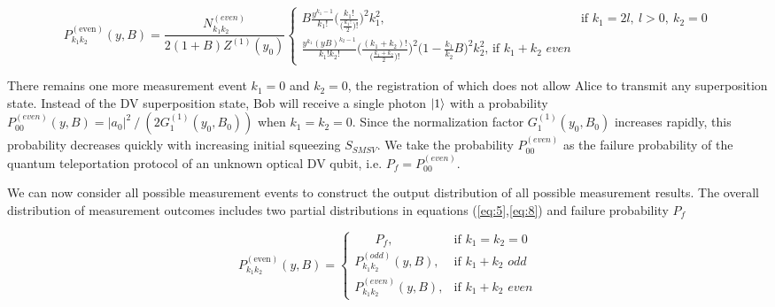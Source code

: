 \documentclass{optica-article}
\begin{document}
\begin{equation}\label{eq:8}
		P_{k_1 k_2}^{(\text{even})}(y,B) =  \frac{N_{k_1k_2}^{(even)}}{2(1+B)Z^{(1)}(y_0)} 
		\begin{cases}
			B\frac{y^{k_1-1}}{k_1!}\Bigg(\frac{k_1!}{\Big(\frac{k_1!}{2}\Big)!}\Bigg)^2k_1^2, & \!\!\!\!\!\!\!\!\!\!\!\!\!\!\!\!\!\!\!\!\!\!\!\!\!\!\!\!\!\!\!\!\!\!\!\!\!\!\!\!\!\!\!\!\!\!\!\!\!\!\!\!\!\!\!\!\!\!\!\!\!\!\!\!\!\!\!\!\!\!\!\!\!\!\!\!\!\!\!\!\!\!\!\!\!\!\!\!\!\!\!
            \text{if } k_1 = 2l,\ l>0,\ k_2 = 0 \\[3ex]
			\frac{y^{k_1}(yB)^{k_2-1}}{k_1!k_2!}\Bigg(\frac{(k_1+k_2)!}{\Big(\frac{k_1+k_2}{2}\Big)!}\Bigg)^2\Big(1-\frac{k_1}{k_2}B\Big)^2k_2^2 , \, \text{if}\,\,k_1+k_2 \,\,even
		\end{cases}
\end{equation}



\par There remains one more measurement event $k_1=0$ and $k_2=0$, the registration of which does not allow Alice to transmit any superposition state. Instead of the DV superposition state, Bob will receive a single photon $\ket{1}$ with a probability $P_{00}^{(even)}(y,B)=\lvert a_0 \lvert^2⁄(2G_1^{(1)}(y_0,B_0))$ when $k_1=k_2=0$. Since the normalization factor $G_1^{(1)}(y_0,B_0)$ increases rapidly, this probability decreases quickly with increasing initial squeezing $S_{SMSV}$. We take the probability $P_{00}^{(even)}$ as the failure probability of the quantum teleportation protocol of an unknown optical DV qubit, i.e. $P_f=P_{00}^{(even)}$. 
\par We can now consider all possible measurement events to construct the output distribution of all possible measurement results. The overall distribution of measurement outcomes includes two partial distributions in equations (\ref{eq:5},\ref{eq:8}) and failure probability $P_f$


\begin{equation}\label{eq:9}
		P_{k_1 k_2}^{(\text{even})}(y,B) =   
		\begin{cases}
			\,\,\,\,\,\,\,\,\,\,P_f , & \!\!\!\!\!\!\!\!\!\!\!\!\!\!\!\!\!\!
            \text{if } k_1 = k_2 = 0 \\[3ex]
            P_{k_1k_2}^{(odd)}(y,B)
			, & \!\!\!\!\text{if } k_1+k_2\,\, odd \\[3ex]
            P_{k_1k_2}^{(even)}(y,B)
			, & \!\!\!\!\text{if } k_1+k_2 \,\,even
            
		\end{cases}
\end{equation}
\end{document}
